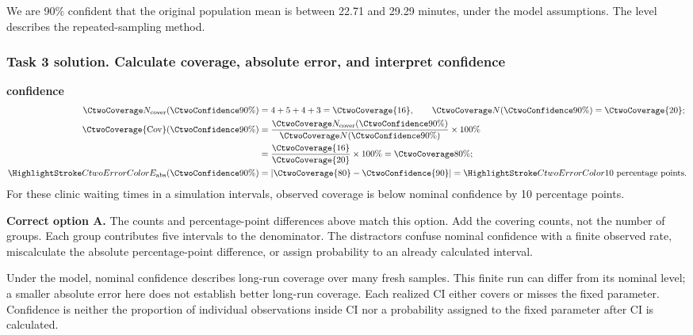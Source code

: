 We are 90\% confident that the original population mean is between 22.71 and 29.29 minutes, under the model assumptions. The level describes the repeated-sampling method.
\par\vspace{3mm}
\clearpage
\subsubsection*{Task 3 solution. Calculate coverage, absolute error, and interpret confidence}
\label{sol:c2-3-c}
\textbf{ confidence}\nopagebreak[4]
\begin{align*}
\CtwoCoverCount(\CtwoConfidence{90\%})&=4+5+4+3=\CtwoCoverage{16},
\qquad\CtwoTotalCount(\CtwoConfidence{90\%})=\CtwoCoverage{20};\\
\CtwoCoverage{\mathrm{Cov}}(\CtwoConfidence{90\%})
&=\frac{\CtwoCoverCount(\CtwoConfidence{90\%})}{\CtwoTotalCount(\CtwoConfidence{90\%})}\times100\%
\\
&=\frac{\CtwoCoverage{16}}{\CtwoCoverage{20}}\times100\%=\CtwoCoverage{80\%};\\
\CtwoError{E_{\rm abs}}(\CtwoConfidence{90\%})
&=\left|\CtwoCoverage{80}-\CtwoConfidence{90}\right|=\CtwoError{10}\ \text{percentage points}.
\end{align*}
For these clinic waiting times in a simulation intervals, observed coverage is below nominal confidence by 10 percentage points.

\textbf{Correct option A.} The counts and percentage-point differences above match this option. Add the covering counts, not the number of groups. Each group contributes five intervals to the denominator. The distractors confuse nominal confidence with a finite observed rate, miscalculate the absolute percentage-point difference, or assign probability to an already calculated interval.

Under the model, nominal confidence describes long-run coverage over many fresh samples. This finite run can differ from its nominal level; a smaller absolute error here does not establish better long-run coverage. Each realized $\mathrm{CI}$ either covers or misses the fixed parameter. Confidence is neither the proportion of individual observations inside $\mathrm{CI}$ nor a probability assigned to the fixed parameter after $\mathrm{CI}$ is calculated.
\par\nopagebreak[4]
\par\vspace{3mm}
\clearpage
